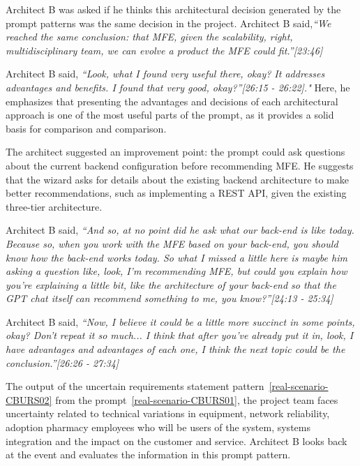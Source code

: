 Architect B was asked if he thinks this architectural decision generated by the prompt patterns was the same decision in the project. Architect B said,\textit{``We reached the same conclusion: that MFE, given the scalability, right, multidisciplinary team, we can evolve a product the MFE could fit.''[23:46]}

Architect B said, \textit{``Look, what I found very useful there, okay? It addresses advantages and benefits. I found that very good, okay?''[26:15 - 26:22]."} Here, he emphasizes that presenting the advantages and decisions of each architectural approach is one of the most useful parts of the prompt, as it provides a solid basis for comparison and comparison.

The architect suggested an improvement point: the prompt could ask questions about the current backend configuration before recommending MFE. He suggests that the wizard asks for details about the existing backend architecture to make better recommendations, such as implementing a REST API, given the existing three-tier architecture. 

Architect B said, \textit{``And so, at no point did he ask what our back-end is like today. Because so, when you work with the MFE based on your back-end, you should know how the back-end works today. So what I missed a little here is maybe him asking a question like, look, I'm recommending MFE, but could you explain how you're explaining a little bit, like the architecture of your back-end so that the GPT chat itself can recommend something to me, you know?''[24:13 - 25:34]}

Architect B said, \textit{``Now, I believe it could be a little more succinct in some points, okay? Don't repeat it so much... I think that after you've already put it in, look, I have advantages and advantages of each one, I think the next topic could be the conclusion.''[26:26 - 27:34]}


The output of the uncertain requirements statement pattern~\ref{real-scenario-CBURS02} from the prompt~\ref{real-scenario-CBURS01}, the project team faces uncertainty related to technical variations in equipment, network reliability, adoption pharmacy employees who will be users of the system, systems integration and the impact on the customer and service. Architect B looks back at the event and evaluates the information in this prompt pattern.

